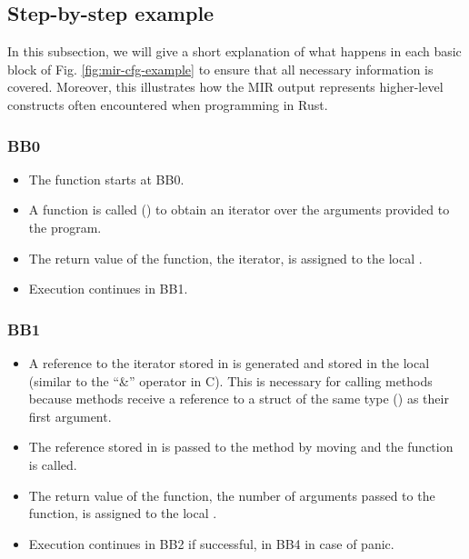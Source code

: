\subsection{Step-by-step example}

In this subsection, we will give a short explanation of what happens
in each basic block of Fig. \ref{fig:mir-cfg-example}
to ensure that all necessary information is covered.
Moreover, this illustrates how the MIR output represents higher-level constructs
often encountered when programming in Rust.

\subsubsection{BB0}

\begin{itemize}
    \item The  function starts at BB0.
    \item A function is called ()
          to obtain an iterator over the arguments provided to the program.
    \item The return value of the function, the iterator,
          is assigned to the local .
    \item Execution continues in BB1.
\end{itemize}

\subsubsection{BB1}

\begin{itemize}
    \item A reference to the iterator stored in  is generated
          and stored in the local  (similar to the ``\&'' operator in C).
          This is necessary for calling methods
          because methods receive a reference
          to a struct of the same type () as their first argument.
    \item The reference stored in  is passed to
          the method  by moving
          and the function is called.
    \item The return value of the function,
          the number of arguments passed to the function, is assigned to the local .
    \item Execution continues in BB2 if successful, in BB4 in case of panic.
\end{itemize}

